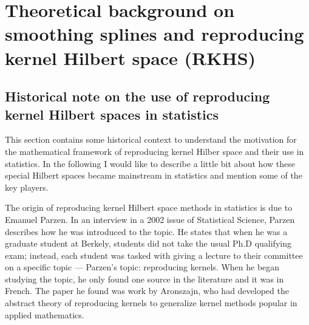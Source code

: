 \section{Theoretical background on smoothing splines and reproducing kernel Hilbert space (RKHS)}
 \label{ch:theoretical background}


\subsection{Historical note on the use of reproducing kernel Hilbert spaces in statistics}

This section contains some historical context to understand the motivation for the mathematical framework of reproducing kernel Hilber space and their use in statistics. In the following I would like to describe a little bit about how these special Hilbert spaces became mainstream in statistics and mention some of the key players. 


The origin of reproducing kernel Hilbert space methods in statistics is due to Emanuel Parzen. In an interview in a 2002 issue of Statistical Science, Parzen describes how he was introduced to the topic. He states that when he was a graduate student at Berkely, students did not take the usual Ph.D qualifying exam; instead, each student was tasked with giving a lecture to their committee on a specific topic --- Parzen's topic: reproducing kernels. When he began studying the topic, he only found one source in the literature and it was in French. The paper he found was work by Aronszajn, who had developed the abstract theory of reproducing kernels to generalize kernel methods popular in applied mathematics. 


